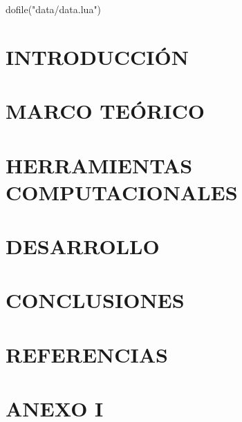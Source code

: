 \documentclass[oneside,a4paper,spanish,links,12pt]{book}
\begin{document}
\begin{luacode}
dofile("data/data.lua")
\end{luacode}



\tableofcontents \pagebreak
\listoffigures \pagebreak
\listoftables \pagebreak
 \printnomenclature \pagebreak


\chapter{INTRODUCCIÓN} \label{capitulo:INTRODUCCION}
 \label{capitulo:1_INTRODUCCION} \pagebreak

\chapter{MARCO TEÓRICO} \label{capitulo:MARCO_TEORICO}
 \label{capitulo:2_MCI} \pagebreak
 \label{capitulo:2_MRCVC} \pagebreak
 \label{capitulo:2_CFD} \pagebreak

\chapter{HERRAMIENTAS COMPUTACIONALES} \label{capitulo:HERRAMIENTAS_COMPUTACIONALES}
 \label{capitulo:3_icesym} \pagebreak
 \label{capitulo:3_optimizador} \pagebreak
 \label{capitulo:3_openfoam} \pagebreak

\chapter{DESARROLLO} \label{capitulo:DESARROLLO}
 \label{capitulo:4_primer_iteracion} \pagebreak
 \label{capitulo:4_flujometrias} \pagebreak
 \label{capitulo:4_segunda_iteracion} \pagebreak


\chapter{CONCLUSIONES} \label{capitulo:5_conclusiones}
 \label{capitulo:5_conclusiones} \pagebreak

\chapter{REFERENCIAS}
\printbibliography[heading=none] \pagebreak

\chapter{ANEXO I}
 \pagebreak
\end{document}
